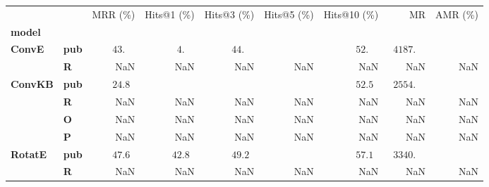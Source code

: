 \begin{tabular}{llrrrrrrr}
\toprule
       &   &           MRR (\%) &                  Hits@1 (\%) &        Hits@3 (\%) & Hits@5 (\%) &       Hits@10 (\%) &                              MR & AMR (\%) \\
\textbf{model} & {} &                    &                              &                    &             &                    &                                 &          \\
\midrule
\textbf{ConvE} & \textbf{pub} &  $43.\phantom{00}$ &  $\phantom{0}4.\phantom{00}$ &  $44.\phantom{00}$ &             &  $52.\phantom{00}$ &  $\phantom{0}4187.\phantom{00}$ &          \\
       & \textbf{R} &                NaN &                          NaN &                NaN &         NaN &                NaN &                             NaN &      NaN \\\midrule
\textbf{ConvKB} & \textbf{pub} &  $24.8\phantom{0}$ &                              &                    &             &  $52.5\phantom{0}$ &  $\phantom{0}2554.\phantom{00}$ &          \\
       & \textbf{R} &                NaN &                          NaN &                NaN &         NaN &                NaN &                             NaN &      NaN \\
       & \textbf{O} &                NaN &                          NaN &                NaN &         NaN &                NaN &                             NaN &      NaN \\
       & \textbf{P} &                NaN &                          NaN &                NaN &         NaN &                NaN &                             NaN &      NaN \\\midrule
\textbf{RotatE} & \textbf{pub} &  $47.6\phantom{0}$ &            $42.8\phantom{0}$ &  $49.2\phantom{0}$ &             &  $57.1\phantom{0}$ &  $\phantom{0}3340.\phantom{00}$ &          \\
       & \textbf{R} &                NaN &                          NaN &                NaN &         NaN &                NaN &                             NaN &      NaN \\
\bottomrule
\end{tabular}

